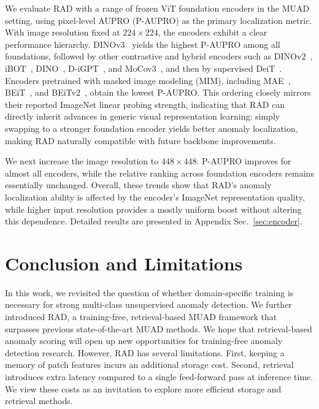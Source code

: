 \documentclass{article}
\theoremstyle{plain}
\theoremstyle{definition}
\theoremstyle{remark}
\begin{document}
We evaluate RAD with a range of frozen ViT foundation encoders in the MUAD setting, using pixel-level AUPRO (P-AUPRO) as the primary localization metric. With image resolution fixed at $224{\times}224$, the encoders exhibit a clear performance hierarchy. DINOv3~\cite{simeoni2025dinov3} yields the highest P-AUPRO among all foundations, followed by other contrastive and hybrid encoders such as DINOv2~\cite{oquab2023dinov2}, iBOT~\cite{zhou2021ibot}, DINO~\cite{caron2021emerging}, D-iGPT~\cite{ren2023rejuvenating}, and MoCov3~\cite{chen2021empirical}, and then by supervised DeiT~\cite{touvron2021training}. Encoders pretrained with masked image modeling (MIM), including MAE~\cite{he2022masked}, BEiT~\cite{bao2021beit}, and BEiTv2~\cite{peng2022beit}, obtain the lowest P-AUPRO. This ordering closely mirrors their reported ImageNet linear probing strength, indicating that  RAD can directly inherit advances in generic visual representation learning: simply swapping to a stronger foundation encoder yields better anomaly localization, making RAD naturally compatible with future backbone improvements.



We next increase the image resolution to $448{\times}448$. P-AUPRO improves for almost all encoders, while the relative ranking across foundation encoders remains essentially unchanged.  Overall, these trends show that RAD’s anomaly localization ability is affected by the encoder’s ImageNet representation quality, while higher input resolution provides a mostly uniform boost without altering this dependence. Detailed results are presented in Appendix Sec.~\ref{sec:encoder}.
\section{Conclusion and Limitations}
In this work, we revisited the question of whether domain-specific training is necessary for strong multi-class unsupervised anomaly detection. We further introduced RAD, a training-free, retrieval-based MUAD framework that surpasses previous state-of-the-art MUAD methods. We hope that retrieval-based anomaly scoring will open up new opportunities for training-free anomaly detection research. However, RAD has several limitations. First, keeping a memory of patch features incurs an additional storage cost. Second, retrieval introduces extra latency compared to a single feed-forward pass at inference time. We view these costs as an invitation to explore more efficient storage and retrieval methods. 
\end{document}
